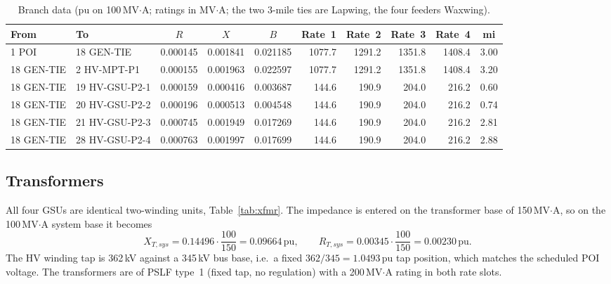 \begin{table}[!ht]
\centering
\footnotesize\setlength{\tabcolsep}{4pt}\begin{tabularx}{\linewidth}{@{}l l r r r r r r r r@{}}
\toprule
\textbf{From} & \textbf{To} & \multicolumn{1}{c}{\textbf{$R$}} & \multicolumn{1}{c}{\textbf{$X$}} & \multicolumn{1}{c}{\textbf{$B$}} & \multicolumn{1}{c}{\textbf{Rate~1}} & \multicolumn{1}{c}{\textbf{Rate~2}} & \multicolumn{1}{c}{\textbf{Rate~3}} & \multicolumn{1}{c}{\textbf{Rate~4}} & \multicolumn{1}{c}{\textbf{mi}} \\
\midrule
 1 POI     & 18 GEN-TIE     & 0.000145 & 0.001841 & 0.021185 & 1077.7 & 1291.2 & 1351.8 & 1408.4 & 3.00 \\
18 GEN-TIE &  2 HV-MPT-P1   & 0.000155 & 0.001963 & 0.022597 & 1077.7 & 1291.2 & 1351.8 & 1408.4 & 3.20 \\
18 GEN-TIE & 19 HV-GSU-P2-1 & 0.000159 & 0.000416 & 0.003687 &  144.6 &  190.9 &  204.0 &  216.2 & 0.60 \\
18 GEN-TIE & 20 HV-GSU-P2-2 & 0.000196 & 0.000513 & 0.004548 &  144.6 &  190.9 &  204.0 &  216.2 & 0.74 \\
18 GEN-TIE & 21 HV-GSU-P2-3 & 0.000745 & 0.001949 & 0.017269 &  144.6 &  190.9 &  204.0 &  216.2 & 2.81 \\
18 GEN-TIE & 28 HV-GSU-P2-4 & 0.000763 & 0.001997 & 0.017699 &  144.6 &  190.9 &  204.0 &  216.2 & 2.88 \\
\bottomrule
\end{tabularx}
\caption{Branch data (pu on 100\,MV$\cdot$A; ratings in MV$\cdot$A; the two 3-mile ties are Lapwing, the four feeders Waxwing).}
\label{tab:branch}
\end{table}

\subsection{Transformers}

All four GSUs are identical two-winding units, Table~\ref{tab:xfmr}. The impedance is
entered on the transformer base of 150\,MV$\cdot$A, so on the 100\,MV$\cdot$A system
base it becomes
\begin{equation}
  X_{T,sys} = 0.14496 \cdot \frac{100}{150} = 0.09664\,\mathrm{pu},
  \qquad
  R_{T,sys} = 0.00345 \cdot \frac{100}{150} = 0.00230\,\mathrm{pu}.
\end{equation}
The HV winding tap is 362\,kV against a 345\,kV bus base, i.e.\ a fixed
$362/345 = 1.0493$\,pu tap position, which matches the scheduled POI voltage. The
transformers are of PSLF type~1 (fixed tap, no regulation) with a 200\,MV$\cdot$A
rating in both rate slots.

